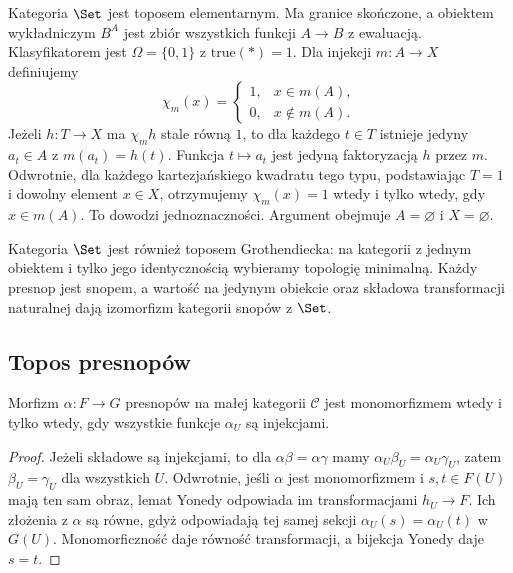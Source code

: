 \begin{przyklad}\label{cat:ex:set-topos}
Kategoria $\Set$ jest toposem elementarnym. Ma granice skończone, a obiektem wykładniczym $B^A$ jest zbiór wszystkich funkcji $A\to B$ z ewaluacją. Klasyfikatorem jest $\Omega=\{0,1\}$ z $\mathrm{true}(*)=1$. Dla injekcji $m:A\to X$ definiujemy
\[
 \chi_m(x)=
 \begin{cases}1,&x\in m(A),\\0,&x\notin m(A).\end{cases}
\]
Jeżeli $h:T\to X$ ma $\chi_m h$ stale równą $1$, to dla każdego $t\in T$ istnieje jedyny $a_t\in A$ z $m(a_t)=h(t)$. Funkcja $t\mapsto a_t$ jest jedyną faktoryzacją $h$ przez $m$. Odwrotnie, dla każdego kartezjańskiego kwadratu tego typu, podstawiając $T=1$ i dowolny element $x\in X$, otrzymujemy $\chi_m(x)=1$ wtedy i tylko wtedy, gdy $x\in m(A)$. To dowodzi jednoznaczności. Argument obejmuje $A=\varnothing$ i $X=\varnothing$.

Kategoria $\Set$ jest również toposem Grothendiecka: na kategorii z jednym obiektem i tylko jego identycznością wybieramy topologię minimalną. Każdy presnop jest snopem, a wartość na jedynym obiekcie oraz składowa transformacji naturalnej dają izomorfizm kategorii snopów z $\Set$.
\end{przyklad}

\subsection{Topos presnopów}

\begin{lemat}\label{cat:lem:presheaf-monos-pointwise}
Morfizm $\alpha:F\to G$ presnopów na małej kategorii $\mathcal C$ jest monomorfizmem wtedy i tylko wtedy, gdy wszystkie funkcje $\alpha_U$ są injekcjami.
\end{lemat}
\begin{proof}
Jeżeli składowe są injekcjami, to dla $\alpha\beta=\alpha\gamma$ mamy $\alpha_U\beta_U=\alpha_U\gamma_U$, zatem $\beta_U=\gamma_U$ dla wszystkich $U$. Odwrotnie, jeśli $\alpha$ jest monomorfizmem i $s,t\in F(U)$ mają ten sam obraz, lemat Yonedy odpowiada im transformacjami $h_U\to F$. Ich złożenia z $\alpha$ są równe, gdyż odpowiadają tej samej sekcji $\alpha_U(s)=\alpha_U(t)$ w $G(U)$. Monomorficzność daje równość transformacji, a bijekcja Yonedy daje $s=t$.
\end{proof}

